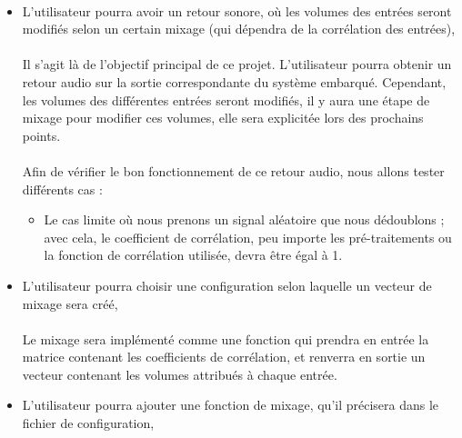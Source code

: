 \documentclass{article}
\begin{document}
\paragraph{}
\begin{itemize}
 \item L'utilisateur pourra avoir un retour sonore, où les volumes des
       entrées seront modifiés selon un certain mixage (qui dépendra de la
       corrélation des entrées),
       \paragraph{}
       Il s'agit là de l'objectif principal de ce projet. L'utilisateur pourra
       obtenir un retour audio sur la sortie correspondante du système embarqué.
       Cependant, les volumes des différentes entrées seront modifiés, il y
       aura une étape de mixage pour modifier ces volumes, elle sera explicitée
       lors des prochains points.
       \paragraph{}
       Afin de vérifier le bon fonctionnement de ce retour audio, nous allons tester
       différents cas :
       \begin{itemize}
        \item Le cas limite où nous prenons un signal aléatoire que nous dédoublons ; avec
              cela, le coefficient de corrélation, peu importe les pré-traitements ou la fonction de
              corrélation utilisée, devra être égal à 1.
       \end{itemize}
       
       
 \item L'utilisateur pourra choisir une configuration selon laquelle un
       vecteur de mixage sera créé,
       \paragraph{}
       Le mixage sera implémenté comme une fonction qui prendra en entrée la
       matrice contenant les coefficients de corrélation, et renverra en sortie
       un vecteur contenant les volumes attribués à chaque entrée.\\
       
 \item L'utilisateur pourra ajouter une fonction de mixage, qu'il précisera
       dans le fichier de configuration,

\end{itemize}
\end{document}
